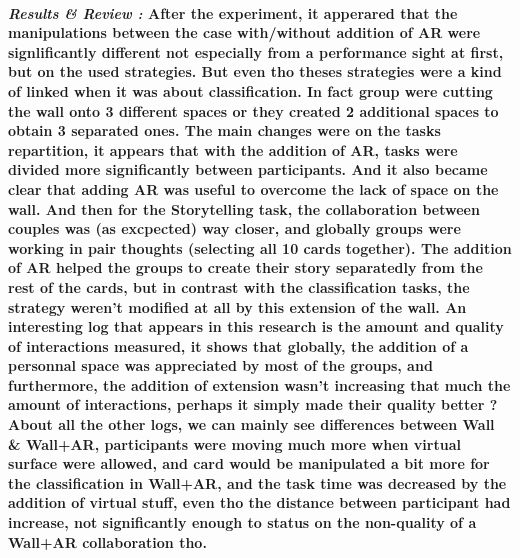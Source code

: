     \paragraph{ \textit{Results \& Review :} 
                \newline
                \indent \indent \textnormal{After the experiment, it apperared that the manipulations between the case with/without addition of AR were signlificantly different
                not especially from a performance sight at first, but on the used strategies. But even tho theses strategies were a kind of linked when it was about classification. 
                In fact group were cutting the wall onto 3 different spaces or they created 2 additional spaces to obtain 3 separated ones. The main changes were on the tasks repartition,
                it appears that with the addition of AR, tasks were divided more significantly between participants. And it also became clear that adding AR was useful to overcome the lack 
                of space on the wall.}
                \newline
                \indent \indent \textnormal{And then for the Storytelling task, the collaboration between couples was (as excpected) way closer, and globally groups were working
                in pair thoughts (selecting all 10 cards together). The addition of AR helped the groups to create their story separatedly from the rest of the cards, but in contrast with 
                the classification tasks, the strategy weren't modified at all by this extension of the wall.}
                \newline
                \indent \indent \textnormal{An interesting log that appears in this research is the amount and quality of interactions measured, it shows that globally, the addition of a 
                personnal space was appreciated by most of the groups, and furthermore, the addition of extension wasn't increasing that much the amount of interactions, perhaps it simply made
                their quality better ?}
                \newline
                \indent \indent \textnormal{About all the other logs, we can mainly see differences between Wall \& Wall+AR, participants were moving much more when virtual surface were allowed,
                and card would be manipulated a bit more for the classification in Wall+AR, and the task time was decreased by the addition of virtual stuff, even tho the distance between participant
                had increase, not significantly enough to status on the non-quality of a Wall+AR collaboration tho.} }

